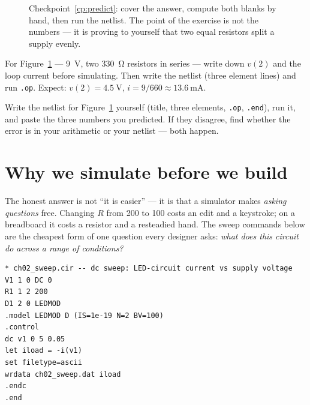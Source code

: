 \begin{figure}[htbp]
\centering

\caption{Checkpoint~\ref{cp:predict}: cover the answer, compute both blanks
by hand, then run the netlist. The point of the exercise is not the numbers —
it is proving to yourself that two equal resistors split a supply evenly.}
\label{fig:predict}
\end{figure}

\begin{checkpoint}
\label{cp:predict}
For Figure~\ref{fig:predict} — \qty{9}{\volt}, two \qty{330}{\ohm} resistors
in series — write down $v(2)$ and the loop current before simulating. Then
write the netlist (three element lines) and run \texttt{.op}. Expect:
$v(2)=\qty{4.5}{\volt}$, $i = 9/660 \approx \qty{13.6}{\milli\ampere}$.
\end{checkpoint}

\begin{exercise}[medium]
Write the netlist for Figure~\ref{fig:predict} yourself (title, three
elements, \texttt{.op}, \texttt{.end}), run it, and paste the three numbers
you predicted. If they disagree, find whether the error is in your arithmetic
or your netlist — both happen.
\end{exercise}

\section{Why we simulate before we build}
\label{sec:whysim}

The honest answer is not ``it is easier'' — it is that a simulator makes
\emph{asking questions} free. Changing $R$ from 200 to 100 costs an edit and
a keystroke; on a breadboard it costs a resistor and a resteadied hand. The
sweep commands below are the cheapest form of one question every designer
asks: \emph{what does this circuit do across a range of conditions?}

\begin{lstlisting}[language={},caption={\texttt{code/ch02\_sweep.cir} -- a
\texttt{.dc} sweep walks the source from 0 to 5 V and records the loop
current at each point.},label={lst:sweepcir}]
* ch02_sweep.cir -- dc sweep: LED-circuit current vs supply voltage
V1 1 0 DC 0
R1 1 2 200
D1 2 0 LEDMOD
.model LEDMOD D (IS=1e-19 N=2 BV=100)
.control
dc v1 0 5 0.05
let iload = -i(v1)
set filetype=ascii
wrdata ch02_sweep.dat iload
.endc
.end
\end{lstlisting}

